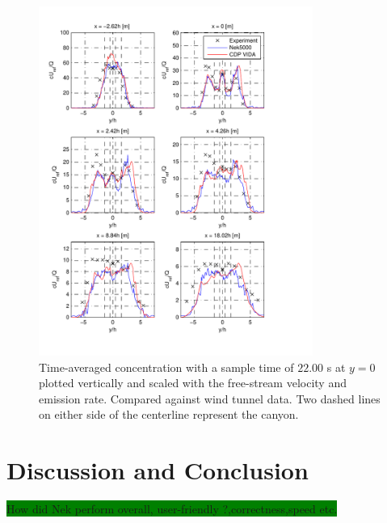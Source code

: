 \begin{figure}[h]
	\centering
	\includegraphics[width=0.8\textwidth]{Figures/Nek_smag_cfluctH.pdf}
	\caption{Time-averaged concentration with a sample time of $22.00$ s at $y = 0$ plotted
    vertically and scaled 
	with the free-stream velocity and emission rate. Compared against wind tunnel data.
Two dashed lines on either side of the centerline represent the canyon.}
	\label{fig:cVsmag}
\end{figure}
%

\section{Discussion and Conclusion}
\colorbox{green}{How did Nek perform overall, user-friendly ?,correctness,speed etc.}


